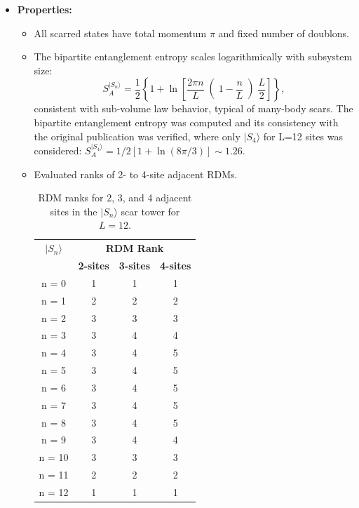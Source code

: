\documentclass[11pt]{article}
\begin{document}
\begin{itemize}
    \item \textbf{Properties:}
    \begin{itemize}
        \item All scarred states have total momentum \( \pi \) and fixed number of doublons.
        \item The bipartite entanglement entropy scales logarithmically with subsystem size:
        \begin{equation}
        S^{|S_n\rangle }_A = \frac{1}{2} \left\{ 1 + \ln \left[ \frac{2 \pi n}{L} \right( 1 - \frac{n}{L}\left) \frac{L}{2}\right] \right\},
        \end{equation}
        consistent with sub-volume law behavior, typical of many-body scars. The bipartite entanglement entropy was computed and its consistency with the original publication was verified, where only $|S_4\rangle$ for L=12 sites was considered: 
        $S^{|S_4\rangle }_A = 1/2 \left[1 + \ln \left(8\pi/3\right) \right] \sim 1.26$.
         
        \item Evaluated ranks of 2- to 4-site adjacent RDMs.
         \begin{table}[H]
	\centering
	\begin{tabular}{|c|ccc|}
	\hline
	\textbf{$|S_n\rangle$} & \multicolumn{3}{c|}{\textbf{RDM Rank}} \\
	\cline{2-4}
	& \textbf{2-sites} & \textbf{3-sites} & \textbf{4-sites}\\
	\hline
	 n = 0 & 1 & 1 & 1 \\
	 n = 1 & 2 & 2 & 2 \\
	 n = 2 & 3 & 3 & 3 \\
	 n = 3 & 3 & 4 & 4 \\
	 n = 4 & 3 & 4 & 5 \\  
	 n = 5 & 3 & 4 & 5 \\
	 n = 6 & 3 & 4 & 5 \\
	 n = 7 & 3 & 4 & 5 \\
	 n = 8 & 3 & 4 & 5 \\
	 n = 9 & 3 & 4 & 4 \\
	 n = 10 & 3 & 3 & 3 \\
	 n = 11 & 2 & 2 & 2 \\
	 n = 12 & 1 & 1 & 1 \\
	\hline
	\end{tabular}
	\caption{RDM ranks for 2, 3, and 4 adjacent sites in the $|S_n\rangle$ scar tower for $L=12$.}
	\label{tab:ranks21}
	\end{table}
    \end{itemize}
    

\end{itemize}
\end{document}
